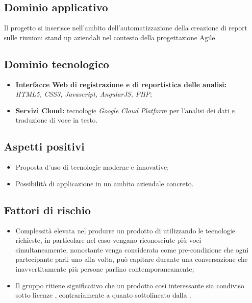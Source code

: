 \documentclass[openany,12pt,a4paper]{report}
\begin{document}
	\subsection{Dominio applicativo}

	Il progetto si inserisce nell'ambito dell'automatizzazione della creazione di report sulle riunioni stand up aziendali nel contesto della progettazione Agile.

	\subsection{Dominio tecnologico}

	\begin{itemize}
		\item \textbf{Interfacce Web di registrazione e di reportistica delle analisi:} \textit{HTML5, CSS3, Javascript, AngularJS, PHP};

		\item \textbf{Servizi Cloud:} tecnologie \textit{Google Cloud Platform} per l’analisi dei dati e traduzione di voce in testo.
	\end{itemize}

	\subsection{Aspetti positivi}

	\begin{itemize}
		\item Proposta d'uso di tecnologie moderne e innovative;

		\item Possibilità di applicazione in un ambito aziendale concreto.
	\end{itemize}

	\subsection{Fattori di rischio}

	\begin{itemize}
		\item Complessità elevata nel produrre un prodotto di  utilizzando le tecnologie richieste, in particolare nel caso vengano riconosciute più voci simultaneamente, nonostante venga considerata come pre-condizione che ogni partecipante parli uno alla volta, può capitare durante una conversazione che inavvertitamente più persone parlino contemporaneamente;

		\item Il gruppo ritiene significativo che un prodotto così interessante sia condiviso sotto licenze , contrariamente a quanto sottolineato dalla .
	\end{itemize}
\end{document}
